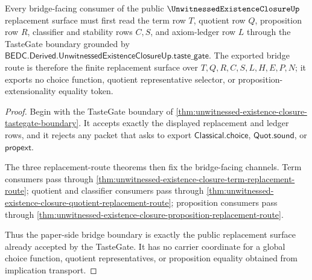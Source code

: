 \begin{theorem}
\label{thm:unwitnessed-existence-closure-bridge-facing-replacement-surface}
Every bridge-facing consumer of the public $\UnwitnessedExistenceClosureUp$ replacement surface must first read the term row $T$, quotient row $Q$, proposition row $R$, classifier and stability rows $C,S$, and axiom-ledger row $L$ through the TasteGate boundary grounded by $\mathsf{BEDC.Derived.UnwitnessedExistenceClosureUp.taste\_gate}$. The exported bridge route is therefore the finite replacement surface over $T,Q,R,C,S,L,H,E,P,N$; it exports no choice function, quotient representative selector, or proposition-extensionality equality token.
\end{theorem}
\begin{proof}
Begin with the TasteGate boundary of \autoref{thm:unwitnessed-existence-closure-tastegate-boundary}. It accepts exactly the displayed replacement and ledger rows, and it rejects any packet that asks to export $\mathsf{Classical.choice}$, $\mathsf{Quot.sound}$, or $\mathsf{propext}$.

The three replacement-route theorems then fix the bridge-facing channels. Term consumers pass through \autoref{thm:unwitnessed-existence-closure-term-replacement-route}; quotient and classifier consumers pass through \autoref{thm:unwitnessed-existence-closure-quotient-replacement-route}; proposition consumers pass through \autoref{thm:unwitnessed-existence-closure-proposition-replacement-route}.

Thus the paper-side bridge boundary is exactly the public replacement surface already accepted by the TasteGate. It has no carrier coordinate for a global choice function, quotient representatives, or proposition equality obtained from implication transport.
\end{proof}



